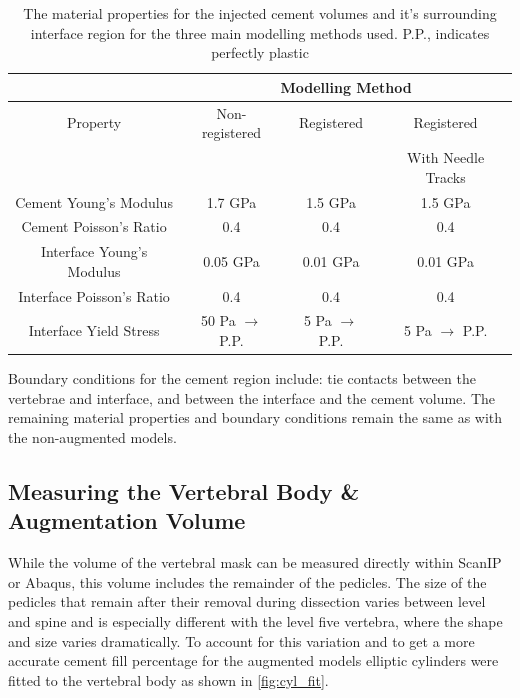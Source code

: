 \begin{table}[h]
\centering
\caption{The material properties for the injected cement volumes and it's
	surrounding interface region for the three main modelling methods
used. P.P., indicates perfectly plastic}
\label{tab:matprops4cmt}
\begin{tabular}{c|c|c|c}
               & \multicolumn{3}{c}{Modelling Method}				\\
	\hline 
	Property	       & Non-registered & Registered & Registered  \\ 
			       &		&	     & With Needle
	Tracks \\ \hline
Cement Young's Modulus    &1.7 GPa            & 1.5 GPa       & 1.5 GPa \\
Cement Poisson's Ratio    &0.4                & 0.4           &0.4  \\ \hline
Interface Young's Modulus & 0.05 GPa          & 0.01 GPa      &0.01 GPa \\ 
Interface Poisson's Ratio & 0.4               & 0.4           & 0.4\\ 
Interface Yield Stress	  & 50 Pa $\rightarrow$ P.P.      & 5 Pa $\rightarrow$
P.P.  & 5 Pa $\rightarrow$ P.P.
\\ \hline
\end{tabular}
\end{table}

Boundary conditions for the cement region include: tie contacts between the vertebrae and interface, and between the interface and the cement volume.
The remaining material properties and boundary conditions remain the same as with the non-augmented models.

\subsection{Measuring the Vertebral Body \& Augmentation Volume}

While the volume of the vertebral mask can be measured directly within ScanIP or Abaqus, this volume includes the remainder of the pedicles.
The size of the pedicles that remain after their removal during dissection varies between level and spine and is especially different with the level five vertebra, where the shape and size varies dramatically.
To account for this variation and to get a more accurate cement fill percentage for the augmented models elliptic cylinders were fitted to the vertebral body as shown in \cref{fig:cyl_fit}.



